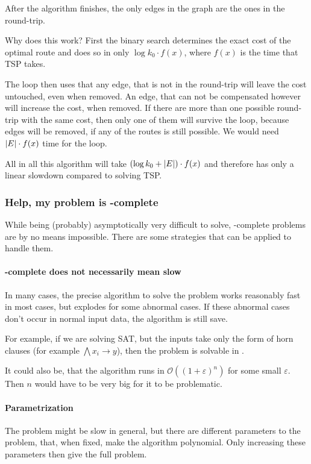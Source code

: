 After the algorithm finishes, the only edges in the graph are the ones in the round-trip.

Why does this work? First the binary search determines the exact cost of the optimal route and does so in only $\log k_0 \cdot f(x)$, where $f(x)$ is the time that TSP takes. 

The loop then uses that any edge, that is not in the round-trip will leave the cost untouched, even when removed. An edge, that can not be compensated however will increase the cost, when removed. If there are more than one possible round-trip with the same cost, then only one of them will survive the loop, because edges will be removed, if any of the routes is still possible. We would need $\left|E\right|\cdot f(x)$ time for the loop.

All in all this algorithm will take $(\log k_0 + \left|E\right|)\cdot f(x)$ and therefore has only a linear slowdown compared to solving TSP.

\subsubsection{Help, my problem is \NPTIME-complete}
While being (probably) asymptotically very difficult to solve, 
\NPTIME-complete problems are by no means impossible. There are some 
strategies that can be applied to handle them.
\paragraph{\NPTIME-complete does not necessarily mean slow}
In many cases, the precise algorithm to solve the problem works reasonably 
fast in most cases, but explodes for some abnormal cases. If these abnormal 
cases don't occur in normal input data, the algorithm is still save.

For example, if we are solving SAT, but the inputs take only the form of horn 
clauses (for example $\bigwedge x_i \rightarrow y$), then the problem is 
solvable in \PTIME. 

It could also be, that the algorithm runs in $\mathcal{O}((1+\varepsilon)^n)$ 
for some small $\varepsilon$. Then $n$ would have to be very big for it to be problematic.
\paragraph{Parametrization}
The problem might be slow in general, but there are different parameters to 
the problem, that, when fixed, make the algorithm polynomial. Only increasing 
these parameters then give the full problem. 

